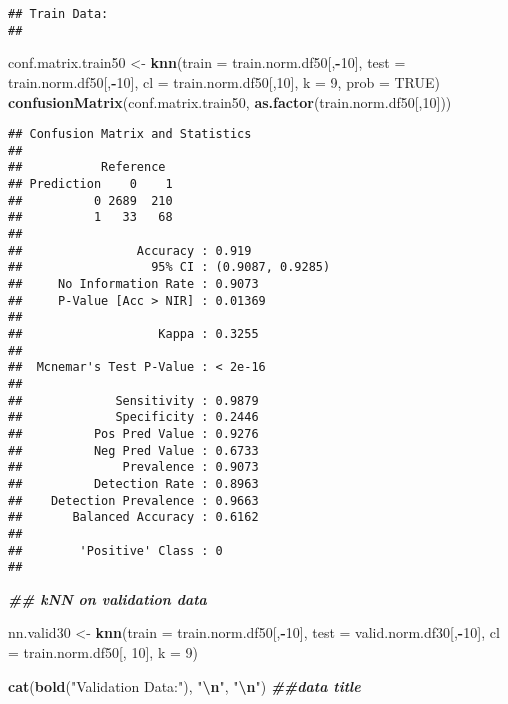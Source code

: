 \documentclass[
]{article}
\newenvironment{Shaded}{\begin{snugshade}}{\end{snugshade}}
\newcommand{\AttributeTok}[1]{\textcolor[rgb]{0.13,0.29,0.53}{#1}}
\newcommand{\ConstantTok}[1]{\textcolor[rgb]{0.56,0.35,0.01}{#1}}
\newcommand{\DecValTok}[1]{\textcolor[rgb]{0.00,0.00,0.81}{#1}}
\newcommand{\DocumentationTok}[1]{\textcolor[rgb]{0.56,0.35,0.01}{\textbf{\textit{#1}}}}
\newcommand{\FunctionTok}[1]{\textcolor[rgb]{0.13,0.29,0.53}{\textbf{#1}}}
\newcommand{\NormalTok}[1]{#1}
\newcommand{\OtherTok}[1]{\textcolor[rgb]{0.56,0.35,0.01}{#1}}
\newcommand{\SpecialCharTok}[1]{\textcolor[rgb]{0.81,0.36,0.00}{\textbf{#1}}}
\newcommand{\StringTok}[1]{\textcolor[rgb]{0.31,0.60,0.02}{#1}}
\begin{document}
\begin{verbatim}
## Train Data: 
## 
\end{verbatim}

\begin{Shaded}
\begin{Highlighting}[]
\NormalTok{conf.matrix.train50 }\OtherTok{\textless{}{-}} \FunctionTok{knn}\NormalTok{(}\AttributeTok{train =}\NormalTok{ train.norm.df50[,}\SpecialCharTok{{-}}\DecValTok{10}\NormalTok{], }\AttributeTok{test =}\NormalTok{ train.norm.df50[,}\SpecialCharTok{{-}}\DecValTok{10}\NormalTok{], }\AttributeTok{cl =}\NormalTok{ train.norm.df50[,}\DecValTok{10}\NormalTok{], }\AttributeTok{k =} \DecValTok{9}\NormalTok{, }\AttributeTok{prob =} \ConstantTok{TRUE}\NormalTok{)}
\FunctionTok{confusionMatrix}\NormalTok{(conf.matrix.train50, }\FunctionTok{as.factor}\NormalTok{(train.norm.df50[,}\DecValTok{10}\NormalTok{]))}
\end{Highlighting}
\end{Shaded}

\begin{verbatim}
## Confusion Matrix and Statistics
## 
##           Reference
## Prediction    0    1
##          0 2689  210
##          1   33   68
##                                           
##                Accuracy : 0.919           
##                  95% CI : (0.9087, 0.9285)
##     No Information Rate : 0.9073          
##     P-Value [Acc > NIR] : 0.01369         
##                                           
##                   Kappa : 0.3255          
##                                           
##  Mcnemar's Test P-Value : < 2e-16         
##                                           
##             Sensitivity : 0.9879          
##             Specificity : 0.2446          
##          Pos Pred Value : 0.9276          
##          Neg Pred Value : 0.6733          
##              Prevalence : 0.9073          
##          Detection Rate : 0.8963          
##    Detection Prevalence : 0.9663          
##       Balanced Accuracy : 0.6162          
##                                           
##        'Positive' Class : 0               
## 
\end{verbatim}

\begin{Shaded}
\begin{Highlighting}[]
\DocumentationTok{\#\# kNN on validation data}

\NormalTok{nn.valid30 }\OtherTok{\textless{}{-}} \FunctionTok{knn}\NormalTok{(}\AttributeTok{train =}\NormalTok{ train.norm.df50[,}\SpecialCharTok{{-}}\DecValTok{10}\NormalTok{], }\AttributeTok{test =}\NormalTok{ valid.norm.df30[,}\SpecialCharTok{{-}}\DecValTok{10}\NormalTok{],}
\AttributeTok{cl =}\NormalTok{ train.norm.df50[, }\DecValTok{10}\NormalTok{], }\AttributeTok{k =} \DecValTok{9}\NormalTok{)}

\FunctionTok{cat}\NormalTok{(}\FunctionTok{bold}\NormalTok{(}\StringTok{"Validation Data:"}\NormalTok{), }\StringTok{"}\SpecialCharTok{\textbackslash{}n}\StringTok{"}\NormalTok{, }\StringTok{"}\SpecialCharTok{\textbackslash{}n}\StringTok{"}\NormalTok{) }\DocumentationTok{\#\#data title}
\end{Highlighting}
\end{Shaded}
\end{document}
